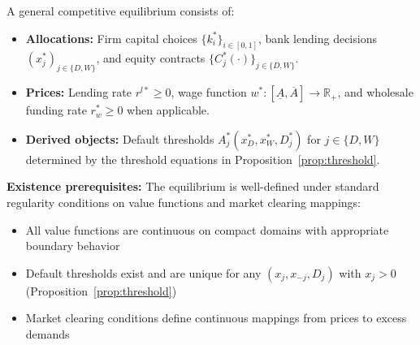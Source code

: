 \documentclass[12pt]{article}
\begin{document}
\begin{definition}\label{def:equilibrium}
A general competitive equilibrium consists of:
\begin{itemize}
    \item \textbf{Allocations:} Firm capital choices $\{k_{i}^{*}\}_{i \in [0,1]}$, bank lending decisions $(x_{j}^{*})_{j \in \{D,W\}}$, and equity contracts $\{C_{j}^{*}(\cdot)\}_{j \in \{D,W\}}$.
    \item \textbf{Prices:} Lending rate $r^{l*} \geq 0$, wage function $w^{*}:[\underline{A},\overline{A}] \to \mathbb{R}_{+}$, and wholesale funding rate $r_w^* \geq 0$ when applicable.
    \item \textbf{Derived objects:} Default thresholds $A_j^*(x_D^*, x_W^*, D_j^*)$ for $j \in \{D,W\}$ determined by the threshold equations in Proposition~\ref{prop:threshold}.
\end{itemize}

\textbf{Existence prerequisites:} The equilibrium is well-defined under standard regularity conditions on value functions and market clearing mappings:
\begin{itemize}
    \item All value functions are continuous on compact domains with appropriate boundary behavior
    \item Default thresholds exist and are unique for any $(x_j, x_{-j}, D_j)$ with $x_j > 0$ (Proposition~\ref{prop:threshold})
    \item Market clearing conditions define continuous mappings from prices to excess demands
\end{itemize}


\end{definition}
\end{document}
